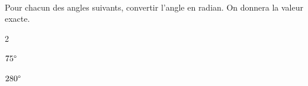 \documentclass[a4paper,12pt]{article}        %
\begin{document}
\\
Pour chacun des angles suivants, convertir l'angle en radian. On donnera la valeur exacte.
\begin{multicols}{2}
\begin{enumMet}
    \item $75\degree$ \quad {}
    \item $280\degree$ \quad {}
\end{enumMet}
\end{multicols}
\end{document}
